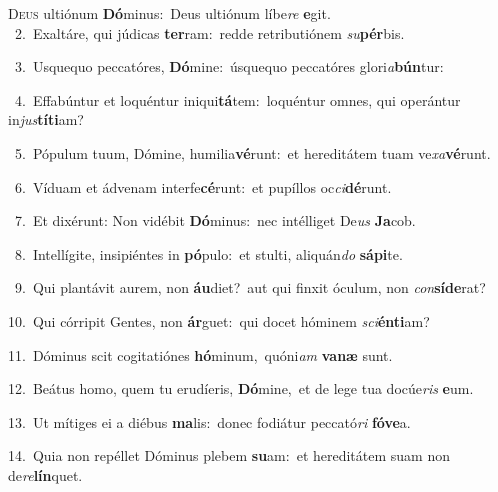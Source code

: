 \lettrine{\initial\textcolor{\initialcolor}{D}}{eus} ultiónum \textbf{Dó}\-minus:~\star Deus ultiónum líbe\textit{re} \textbf{e}\-git.\\
{\numbfont\textcolor{\numbcolor}{~2.}}~Exaltáre, qui júdicas \textbf{ter}\-ram:~\star redde retributiónem \textit{su}\-\textbf{pér}bis.\par
{\numbfont\textcolor{\numbcolor}{~3.}}~Usquequo peccatóres, \textbf{Dó}\-mine:~\star úsquequo peccatóres glori\-\textit{a}\-\textbf{bún}tur:\par
{\numbfont\textcolor{\numbcolor}{~4.}}~Effabúntur et loquéntur iniqui\-\textbf{tá}\-tem:~\star loquéntur omnes, qui operántur in\-\textit{jus}\-\textbf{tí}\textbf{ti}am?\par
{\numbfont\textcolor{\numbcolor}{~5.}}~Pópulum tuum, Dómine, humilia\-\textbf{vé}\-runt:~\star et hereditátem tuam ve\-\textit{xa}\-\textbf{vé}runt.\par
{\numbfont\textcolor{\numbcolor}{~6.}}~Víduam et ádvenam interfe\-\textbf{cé}\-runt:~\star et pupíllos oc\-\textit{ci}\-\textbf{dé}runt.\par
{\numbfont\textcolor{\numbcolor}{~7.}}~Et dixérunt: Non vidébit \textbf{Dó}\-minus:~\star nec intélliget De\textit{us} \textbf{Ja}\-cob.\par
{\numbfont\textcolor{\numbcolor}{~8.}}~Intellígite, insipiéntes in \textbf{pó}\-pulo:~\star et stulti, aliquán\textit{do} \textbf{sá}\-\textbf{pi}te.\par
{\numbfont\textcolor{\numbcolor}{~9.}}~Qui plantávit aurem, non \textbf{áu}\-diet?~\star aut qui finxit óculum, non \textit{con}\-\textbf{sí}\textbf{de}rat?\par
{\numbfont\textcolor{\numbcolor}{10.}}~Qui córripit Gentes, non \textbf{ár}\-guet:~\star qui docet hóminem \textit{sci}\-\textbf{én}\textbf{ti}am?\par
{\numbfont\textcolor{\numbcolor}{11.}}~Dóminus scit cogitatiónes \textbf{hó}\-minum,~\star quóni\textit{am} \textbf{va}\-\textbf{næ} sunt.\par
{\numbfont\textcolor{\numbcolor}{12.}}~Beátus homo, quem tu erudíeris, \textbf{Dó}\-mine,~\star et de lege tua docúe\textit{ris} \textbf{e}\-um.\par
{\numbfont\textcolor{\numbcolor}{13.}}~Ut mítiges ei a diébus \textbf{ma}\-lis:~\star donec fodiátur peccató\textit{ri} \textbf{fó}\-\textbf{ve}a.\par
{\numbfont\textcolor{\numbcolor}{14.}}~Quia non repéllet Dóminus plebem \textbf{su}\-am:~\star et hereditátem suam non de\-\textit{re}\-\textbf{lín}quet.\par
